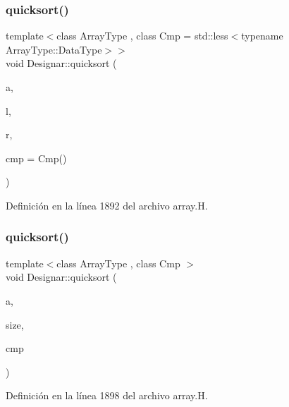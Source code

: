 \subsubsection{\texorpdfstring{quicksort()}{quicksort()}\hspace{0.1cm}{\footnotesize\ttfamily [10/14]}}
{\footnotesize\ttfamily template$<$class Array\+Type , class Cmp  = std\+::less$<$typename Array\+Type\+::\+Data\+Type$>$$>$ \\
void Designar\+::quicksort (\begin{DoxyParamCaption}\item[{Array\+Type \&}]{a,  }\item[{\hyperlink{namespace_designar_a9d113d66a39e82b73727c72cd3a52f73}{lint\+\_\+t}}]{l,  }\item[{\hyperlink{namespace_designar_a9d113d66a39e82b73727c72cd3a52f73}{lint\+\_\+t}}]{r,  }\item[{Cmp \&\&}]{cmp = {\ttfamily Cmp()} }\end{DoxyParamCaption})\hspace{0.3cm}{\ttfamily [inline]}}



Definición en la línea 1892 del archivo array.\+H.

\mbox{\label{namespace_designar_a4887d9486cdfcd7e021047915ae26651}} 
\subsubsection{\texorpdfstring{quicksort()}{quicksort()}\hspace{0.1cm}{\footnotesize\ttfamily [11/14]}}
{\footnotesize\ttfamily template$<$class Array\+Type , class Cmp $>$ \\
void Designar\+::quicksort (\begin{DoxyParamCaption}\item[{Array\+Type \&}]{a,  }\item[{\hyperlink{namespace_designar_a9d113d66a39e82b73727c72cd3a52f73}{lint\+\_\+t}}]{size,  }\item[{Cmp \&}]{cmp }\end{DoxyParamCaption})\hspace{0.3cm}{\ttfamily [inline]}}



Definición en la línea 1898 del archivo array.\+H.

